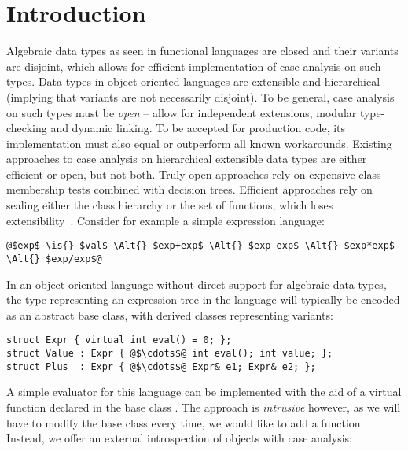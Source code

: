 \section{Introduction} %
\label{sec:intro}


Algebraic data types as seen in functional languages are closed and their 
variants are disjoint, which allows for efficient implementation of case analysis 
on such types. Data types in object-oriented languages are extensible
and hierarchical (implying that variants are not necessarily 
disjoint). 
To be general, case analysis on such types must be \emph{open} -- allow for 
independent extensions, modular type-checking and dynamic linking. To be 
accepted for production code, its implementation must also equal or outperform 
all known workarounds. Existing approaches to case analysis on hierarchical 
extensible data types are either efficient or open, but not both.
Truly open approaches rely on expensive class-membership tests combined with 
decision trees. Efficient approaches rely on sealing either the class 
hierarchy or the set of functions, which loses 
extensibility~\cite{Cohen91,DesignPatterns1993,Vitek97,PQEncoding}.  
Consider for example a simple expression language: 

\begin{lstlisting}
@$exp$ \is{} $val$ \Alt{} $exp+exp$ \Alt{} $exp-exp$ \Alt{} $exp*exp$ \Alt{} $exp/exp$@
\end{lstlisting}

\noindent 
In an object-oriented language without direct support for algebraic data types, 
the type representing an expression-tree in the language will typically be 
encoded as an abstract base class, %
with derived classes representing variants:

\begin{lstlisting}[keepspaces,columns=flexible]
struct Expr { virtual int eval() = 0; };
struct Value : Expr { @$\cdots$@ int eval(); int value; };
struct Plus  : Expr { @$\cdots$@ Expr& e1; Expr& e2; };
\end{lstlisting}

\noindent
A simple evaluator for this language can be implemented with the aid of a
virtual function  declared in the base class . 
The approach is \emph{intrusive} however, as we will have to modify the base class every 
time, we would like to add a function. 
Instead, we offer an external introspection of objects with case analysis:

